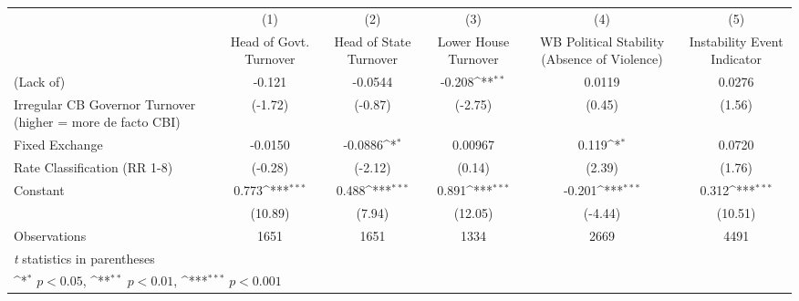 {
\def\sym#1{\ifmmode^{#1}\else\(^{#1}\)\fi}
\begin{tabular}{l*{5}{c}}
\toprule
                &\multicolumn{1}{c}{(1)}&\multicolumn{1}{c}{(2)}&\multicolumn{1}{c}{(3)}&\multicolumn{1}{c}{(4)}&\multicolumn{1}{c}{(5)}\\
                &\multicolumn{1}{c}{Head of Govt. Turnover}&\multicolumn{1}{c}{Head of State Turnover}&\multicolumn{1}{c}{Lower House Turnover}&\multicolumn{1}{c}{WB Political Stability (Absence of Violence)}&\multicolumn{1}{c}{Instability Event Indicator}\\
\midrule
(Lack of)       &   -0.121         &  -0.0544         &   -0.208\sym{**} &   0.0119         &   0.0276         \\
Irregular CB Governor Turnover (higher = more de facto CBI)&  (-1.72)         &  (-0.87)         &  (-2.75)         &   (0.45)         &   (1.56)         \\
\addlinespace
Fixed Exchange  &  -0.0150         &  -0.0886\sym{*}  &  0.00967         &    0.119\sym{*}  &   0.0720         \\
Rate Classification (RR 1-8)&  (-0.28)         &  (-2.12)         &   (0.14)         &   (2.39)         &   (1.76)         \\
\addlinespace
Constant        &    0.773\sym{***}&    0.488\sym{***}&    0.891\sym{***}&   -0.201\sym{***}&    0.312\sym{***}\\
                &  (10.89)         &   (7.94)         &  (12.05)         &  (-4.44)         &  (10.51)         \\
\midrule
Observations    &     1651         &     1651         &     1334         &     2669         &     4491         \\
\bottomrule
\multicolumn{6}{l}{\footnotesize \textit{t} statistics in parentheses}\\
\multicolumn{6}{l}{\footnotesize \sym{*} \(p<0.05\), \sym{**} \(p<0.01\), \sym{***} \(p<0.001\)}\\
\end{tabular}
}
